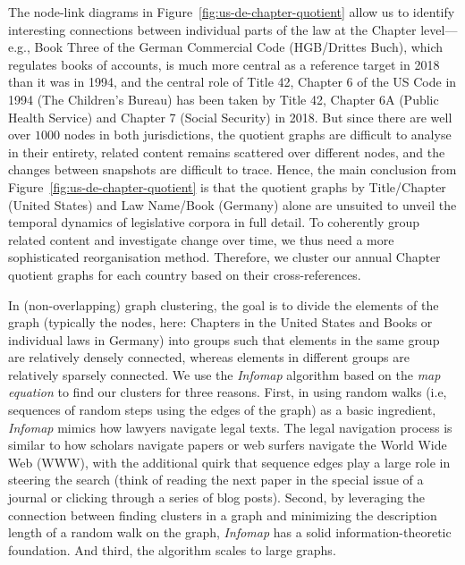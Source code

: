 The node-link diagrams in Figure~\ref{fig:us-de-chapter-quotient} allow us to identify interesting connections between individual parts of the law at the Chapter level---%
e.g., Book Three of the German Commercial Code (HGB/Drittes Buch), which regulates books of accounts, is much more central as a reference target in 2018 than it was in 1994, 
and the central role of Title 42, Chapter 6 of the US Code in 1994 (The Children's Bureau) has been taken by Title 42, Chapter 6A (Public Health Service) and Chapter 7 (Social Security) in 2018. 
But since there are well over $1000$ nodes in both jurisdictions, 
the quotient graphs are difficult to analyse in their entirety,
related content remains scattered over different nodes, 
and the changes between snapshots are difficult to trace.
Hence, the main conclusion from Figure~\ref{fig:us-de-chapter-quotient} is that the quotient graphs by Title/Chapter (United States) and Law Name/Book (Germany) alone are unsuited to unveil the temporal dynamics of legislative corpora in full detail.
To coherently group related content and investigate change over time, 
we thus need a more sophisticated reorganisation method. 
Therefore, we cluster our annual Chapter quotient graphs for each country based on their cross-references. 

In (non-overlapping) graph clustering, 
the goal is to divide the elements of the graph (typically the nodes, here: Chapters in the United States and Books or individual laws in Germany) 
into groups such that elements in the same group are relatively densely connected, 
whereas elements in different groups are relatively sparsely connected.
We use the \emph{Infomap} algorithm based on the \emph{map equation} \cite{rosvall2008,rosvall2009} to find our clusters for three reasons. 
First, in using random walks (i.e, sequences of random steps using the edges of the graph) as a basic ingredient, 
\emph{Infomap} mimics how lawyers navigate legal texts. 
The legal navigation process is similar to how scholars navigate papers or web surfers navigate the World Wide Web (WWW), 
with the additional quirk that sequence edges play a large role in steering the search 
(think of reading the next paper in the special issue of a journal or clicking through a series of blog posts). 
Second, by leveraging the connection between finding clusters in a graph and minimizing the description length of a random walk on the graph, \emph{Infomap} has a solid information-theoretic foundation.
And third, the algorithm scales to large graphs. 

